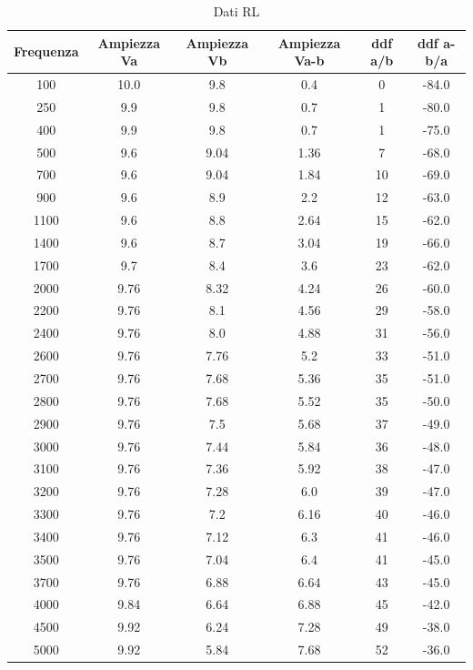 \documentclass[letterpaper,12pt]{article}
\begin{document}
\begin{table}[htbp]
    \centering
    \caption{Dati RL}
    \begin{tabular}{cccccc}
        \toprule
        Frequenza & Ampiezza Va & Ampiezza Vb & Ampiezza Va-b & ddf a/b & ddf a-b/a \\
        \midrule
        100 & 10.0 & 9.8 & 0.4 & 0 & -84.0 \\
        250 & 9.9 & 9.8 & 0.7 & 1 & -80.0 \\
        400 & 9.9 & 9.8 & 0.7 & 1 & -75.0 \\
        500 & 9.6 & 9.04 & 1.36 & 7 & -68.0 \\
        700 & 9.6 & 9.04 & 1.84 & 10 & -69.0 \\
        900 & 9.6 & 8.9 & 2.2 & 12 & -63.0 \\
        1100 & 9.6 & 8.8 & 2.64 & 15 & -62.0 \\
        1400 & 9.6 & 8.7 & 3.04 & 19 & -66.0 \\
        1700 & 9.7 & 8.4 & 3.6 & 23 & -62.0 \\
        2000 & 9.76 & 8.32 & 4.24 & 26 & -60.0 \\
        2200 & 9.76 & 8.1 & 4.56 & 29 & -58.0 \\
        2400 & 9.76 & 8.0 & 4.88 & 31 & -56.0 \\
        2600 & 9.76 & 7.76 & 5.2 & 33 & -51.0 \\
        2700 & 9.76 & 7.68 & 5.36 & 35 & -51.0 \\
        2800 & 9.76 & 7.68 & 5.52 & 35 & -50.0 \\
        2900 & 9.76 & 7.5 & 5.68 & 37 & -49.0 \\
        3000 & 9.76 & 7.44 & 5.84 & 36 & -48.0 \\
        3100 & 9.76 & 7.36 & 5.92 & 38 & -47.0 \\
        3200 & 9.76 & 7.28 & 6.0 & 39 & -47.0 \\
        3300 & 9.76 & 7.2 & 6.16 & 40 & -46.0 \\
        3400 & 9.76 & 7.12 & 6.3 & 41 & -46.0 \\
        3500 & 9.76 & 7.04 & 6.4 & 41 & -45.0 \\
        3700 & 9.76 & 6.88 & 6.64 & 43 & -45.0 \\
        4000 & 9.84 & 6.64 & 6.88 & 45 & -42.0 \\
        4500 & 9.92 & 6.24 & 7.28 & 49 & -38.0 \\
        5000 & 9.92 & 5.84 & 7.68 & 52 & -36.0 \\

\end{tabular}
\end{table}
\end{document}

